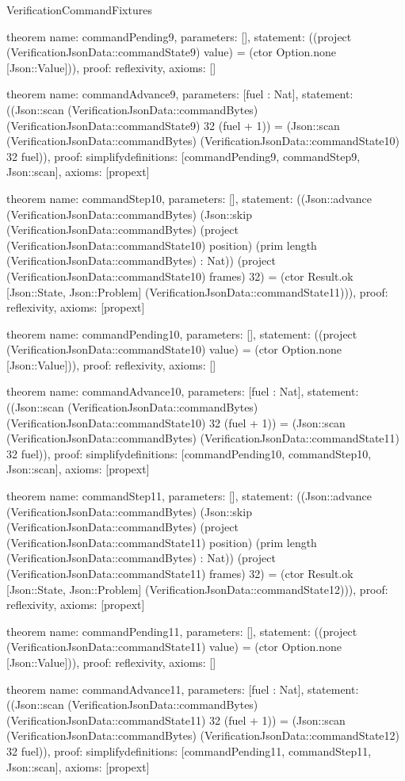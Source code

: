 \begin{lexlean}{VerificationCommandFixtures}
\begin{semanticmodule}
theorem{
  name: commandPending9,
  parameters: [],
  statement: ((project (VerificationJsonData::commandState9) value) = (ctor Option.none [Json::Value])),
  proof: reflexivity{},
  axioms: []
}

theorem{
  name: commandAdvance9,
  parameters: [fuel : Nat],
  statement: ((Json::scan (VerificationJsonData::commandBytes) (VerificationJsonData::commandState9) 32 (fuel + 1)) = (Json::scan (VerificationJsonData::commandBytes) (VerificationJsonData::commandState10) 32 fuel)),
  proof: simplify{definitions: [commandPending9, commandStep9, Json::scan]},
  axioms: [propext]
}

theorem{
  name: commandStep10,
  parameters: [],
  statement: ((Json::advance (VerificationJsonData::commandBytes) (Json::skip (VerificationJsonData::commandBytes) (project (VerificationJsonData::commandState10) position) (prim length (VerificationJsonData::commandBytes) : Nat)) (project (VerificationJsonData::commandState10) frames) 32) = (ctor Result.ok [Json::State, Json::Problem] (VerificationJsonData::commandState11))),
  proof: reflexivity{},
  axioms: [propext]
}

theorem{
  name: commandPending10,
  parameters: [],
  statement: ((project (VerificationJsonData::commandState10) value) = (ctor Option.none [Json::Value])),
  proof: reflexivity{},
  axioms: []
}

theorem{
  name: commandAdvance10,
  parameters: [fuel : Nat],
  statement: ((Json::scan (VerificationJsonData::commandBytes) (VerificationJsonData::commandState10) 32 (fuel + 1)) = (Json::scan (VerificationJsonData::commandBytes) (VerificationJsonData::commandState11) 32 fuel)),
  proof: simplify{definitions: [commandPending10, commandStep10, Json::scan]},
  axioms: [propext]
}

theorem{
  name: commandStep11,
  parameters: [],
  statement: ((Json::advance (VerificationJsonData::commandBytes) (Json::skip (VerificationJsonData::commandBytes) (project (VerificationJsonData::commandState11) position) (prim length (VerificationJsonData::commandBytes) : Nat)) (project (VerificationJsonData::commandState11) frames) 32) = (ctor Result.ok [Json::State, Json::Problem] (VerificationJsonData::commandState12))),
  proof: reflexivity{},
  axioms: [propext]
}

theorem{
  name: commandPending11,
  parameters: [],
  statement: ((project (VerificationJsonData::commandState11) value) = (ctor Option.none [Json::Value])),
  proof: reflexivity{},
  axioms: []
}

theorem{
  name: commandAdvance11,
  parameters: [fuel : Nat],
  statement: ((Json::scan (VerificationJsonData::commandBytes) (VerificationJsonData::commandState11) 32 (fuel + 1)) = (Json::scan (VerificationJsonData::commandBytes) (VerificationJsonData::commandState12) 32 fuel)),
  proof: simplify{definitions: [commandPending11, commandStep11, Json::scan]},
  axioms: [propext]
}


\end{semanticmodule}
\end{lexlean}

